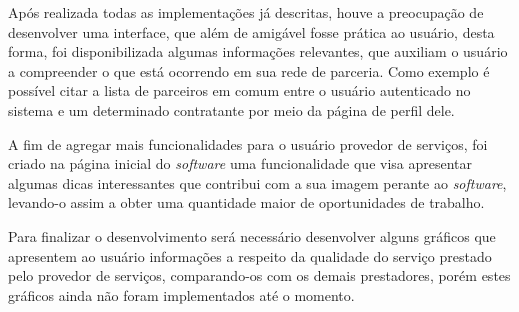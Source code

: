 \par Após realizada todas as implementações já descritas, houve a preocupação de desenvolver uma interface, que além de amigável fosse prática ao usuário, desta forma, foi disponibilizada algumas informações relevantes, que auxiliam o usuário a compreender o que está ocorrendo em sua rede de parceria. Como exemplo é possível citar a lista de parceiros em comum entre o usuário autenticado no sistema e um determinado contratante por meio da página de perfil dele.

\par A fim de agregar mais funcionalidades para o usuário provedor de serviços, foi criado na página inicial do \textit{software} uma funcionalidade que visa apresentar algumas dicas interessantes que contribui com a sua imagem perante ao \textit{software}, levando-o assim a obter uma quantidade maior de oportunidades de trabalho.

\par Para finalizar o desenvolvimento será necessário desenvolver alguns gráficos que apresentem ao usuário informações a respeito da qualidade do serviço prestado pelo provedor de serviços, comparando-os com os demais prestadores, porém estes gráficos ainda não foram implementados até o momento.
